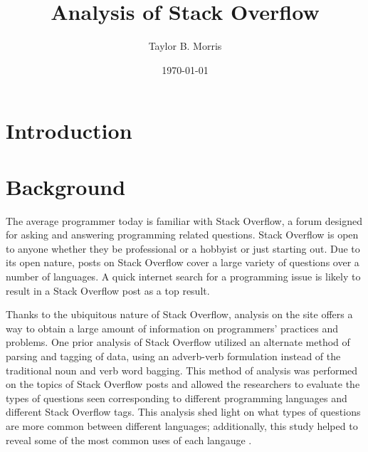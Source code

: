 \documentclass{article}
\author{Taylor B. Morris}
\title{Analysis of Stack Overflow}
\date{\today}
\begin{document}
\maketitle
\begin{abstract}
\end{abstract}
\section{Introduction}
\section{Background}
The average programmer today is familiar with Stack Overflow, a forum
designed for asking and answering programming related questions. Stack
Overflow is open to anyone whether they be professional or a hobbyist or
just starting out. Due to its open nature, posts on Stack Overflow cover
a large variety of questions over a number of languages. A quick internet
search for a programming issue is likely to result in a Stack Overflow post
as a top result.

Thanks to the ubiquitous nature of Stack Overflow, analysis on the site
offers a way to obtain a large amount of information on programmers'
practices and problems. One prior analysis of Stack Overflow utilized an 
alternate method of parsing and tagging of data, using an adverb-verb 
formulation instead of the traditional noun and verb word bagging. This 
method of analysis was performed on the topics of Stack Overflow posts and 
allowed the researchers to evaluate the types of questions seen 
corresponding to different programming languages and different Stack 
Overflow tags. This analysis shed light on what types of questions are more 
common between different languages; additionally, this study helped to 
reveal some of the most common uses of each langauge \cite{allamanis2013and}.

 
\end{document}
